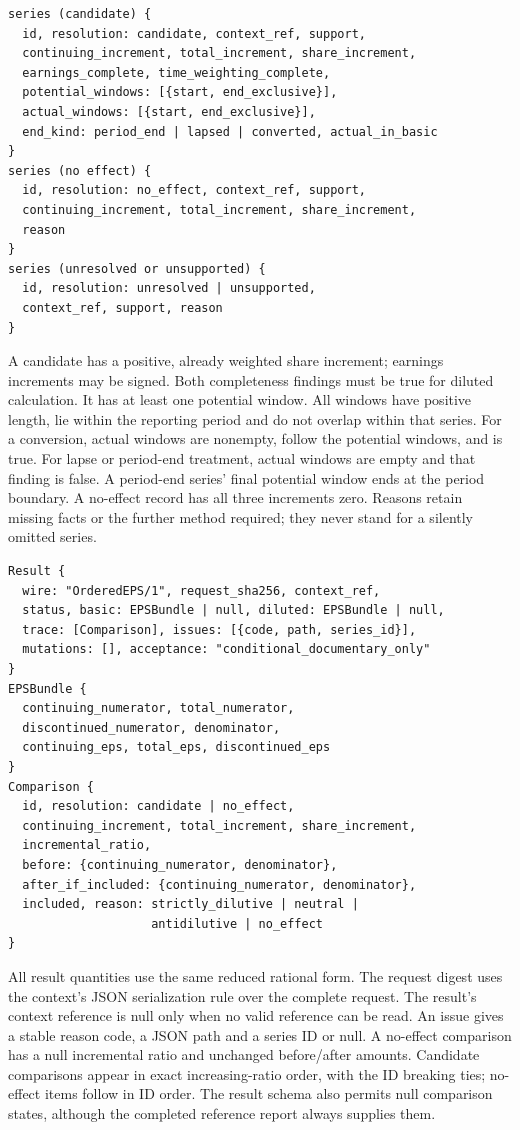\begin{lstlisting}
series (candidate) {
  id, resolution: candidate, context_ref, support,
  continuing_increment, total_increment, share_increment,
  earnings_complete, time_weighting_complete,
  potential_windows: [{start, end_exclusive}],
  actual_windows: [{start, end_exclusive}],
  end_kind: period_end | lapsed | converted, actual_in_basic
}
series (no effect) {
  id, resolution: no_effect, context_ref, support,
  continuing_increment, total_increment, share_increment,
  reason
}
series (unresolved or unsupported) {
  id, resolution: unresolved | unsupported,
  context_ref, support, reason
}
\end{lstlisting}

A candidate has a positive, already weighted share increment; earnings
increments may be signed. Both completeness findings must be true for diluted
calculation. It has at least one potential window. All windows have positive
length, lie within the reporting period and do not overlap within that series.
For a conversion, actual windows are nonempty, follow the potential windows,
and  is true. For lapse or period-end treatment, actual
windows are empty and that finding is false. A period-end series' final
potential window ends at the period boundary. A no-effect record has all three
increments zero. Reasons retain missing facts or the further method required;
they never stand for a silently omitted series.

\begin{lstlisting}
Result {
  wire: "OrderedEPS/1", request_sha256, context_ref,
  status, basic: EPSBundle | null, diluted: EPSBundle | null,
  trace: [Comparison], issues: [{code, path, series_id}],
  mutations: [], acceptance: "conditional_documentary_only"
}
EPSBundle {
  continuing_numerator, total_numerator,
  discontinued_numerator, denominator,
  continuing_eps, total_eps, discontinued_eps
}
Comparison {
  id, resolution: candidate | no_effect,
  continuing_increment, total_increment, share_increment,
  incremental_ratio,
  before: {continuing_numerator, denominator},
  after_if_included: {continuing_numerator, denominator},
  included, reason: strictly_dilutive | neutral |
                    antidilutive | no_effect
}
\end{lstlisting}

All result quantities use the same reduced rational form. The request digest
uses the context's JSON serialization rule over the complete request.
The result's context reference is null only when no valid reference can be
read. An issue gives a stable reason code, a JSON path and a series ID or
null. A no-effect comparison has a null incremental ratio and unchanged
before/after amounts. Candidate comparisons appear in exact increasing-ratio
order, with the ID breaking ties; no-effect items follow in ID order.
The result schema also permits null comparison states, although the completed
reference report always supplies them.

